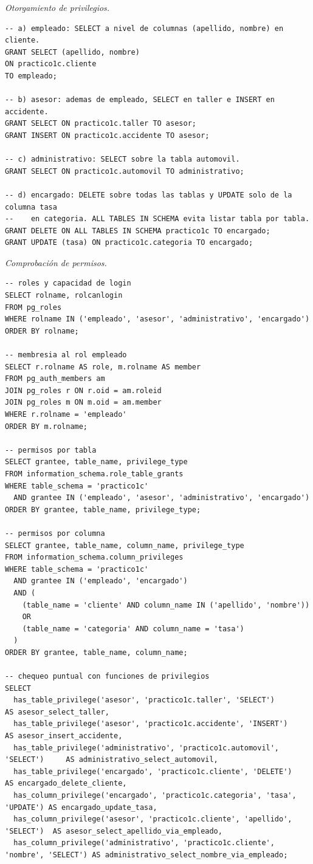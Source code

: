 \documentclass[11pt,a4paper]{article}
\begin{document}
\textit{Otorgamiento de privilegios.}

\begin{lstlisting}
-- a) empleado: SELECT a nivel de columnas (apellido, nombre) en cliente.
GRANT SELECT (apellido, nombre)
ON practico1c.cliente
TO empleado;

-- b) asesor: ademas de empleado, SELECT en taller e INSERT en accidente.
GRANT SELECT ON practico1c.taller TO asesor;
GRANT INSERT ON practico1c.accidente TO asesor;

-- c) administrativo: SELECT sobre la tabla automovil.
GRANT SELECT ON practico1c.automovil TO administrativo;

-- d) encargado: DELETE sobre todas las tablas y UPDATE solo de la columna tasa
--    en categoria. ALL TABLES IN SCHEMA evita listar tabla por tabla.
GRANT DELETE ON ALL TABLES IN SCHEMA practico1c TO encargado;
GRANT UPDATE (tasa) ON practico1c.categoria TO encargado;
\end{lstlisting}

\textit{Comprobación de permisos.}

\begin{lstlisting}
-- roles y capacidad de login
SELECT rolname, rolcanlogin
FROM pg_roles
WHERE rolname IN ('empleado', 'asesor', 'administrativo', 'encargado')
ORDER BY rolname;

-- membresia al rol empleado
SELECT r.rolname AS role, m.rolname AS member
FROM pg_auth_members am
JOIN pg_roles r ON r.oid = am.roleid
JOIN pg_roles m ON m.oid = am.member
WHERE r.rolname = 'empleado'
ORDER BY m.rolname;

-- permisos por tabla
SELECT grantee, table_name, privilege_type
FROM information_schema.role_table_grants
WHERE table_schema = 'practico1c'
  AND grantee IN ('empleado', 'asesor', 'administrativo', 'encargado')
ORDER BY grantee, table_name, privilege_type;

-- permisos por columna
SELECT grantee, table_name, column_name, privilege_type
FROM information_schema.column_privileges
WHERE table_schema = 'practico1c'
  AND grantee IN ('empleado', 'encargado')
  AND (
    (table_name = 'cliente' AND column_name IN ('apellido', 'nombre'))
    OR
    (table_name = 'categoria' AND column_name = 'tasa')
  )
ORDER BY grantee, table_name, column_name;

-- chequeo puntual con funciones de privilegios
SELECT
  has_table_privilege('asesor', 'practico1c.taller', 'SELECT')                AS asesor_select_taller,
  has_table_privilege('asesor', 'practico1c.accidente', 'INSERT')             AS asesor_insert_accidente,
  has_table_privilege('administrativo', 'practico1c.automovil', 'SELECT')     AS administrativo_select_automovil,
  has_table_privilege('encargado', 'practico1c.cliente', 'DELETE')            AS encargado_delete_cliente,
  has_column_privilege('encargado', 'practico1c.categoria', 'tasa', 'UPDATE') AS encargado_update_tasa,
  has_column_privilege('asesor', 'practico1c.cliente', 'apellido', 'SELECT')  AS asesor_select_apellido_via_empleado,
  has_column_privilege('administrativo', 'practico1c.cliente', 'nombre', 'SELECT') AS administrativo_select_nombre_via_empleado;
\end{lstlisting}
\end{document}
